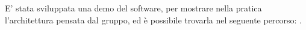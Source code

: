 E' stata sviluppata una demo del software, per mostrare nella pratica l'architettura pensata dal gruppo, ed è possibile trovarla nel seguente percorso: . \\